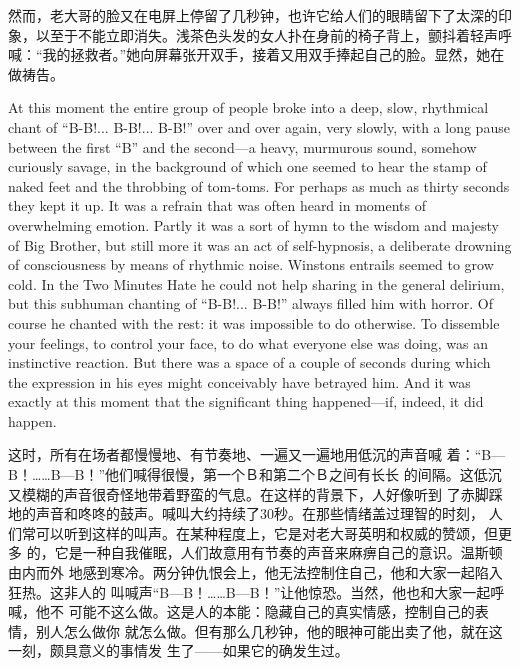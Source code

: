 \begin{paracol}{2}
\switchcolumn

然而，老大哥的脸又在电屏上停留了几秒钟，也许它给人们的眼睛留下了太深的印象，以至于不能立即消失。浅茶色头发的女人扑在身前的椅子背上，颤抖着轻声呼喊：``我的拯救者。''她向屏幕张开双手，接着又用双手捧起自己的脸。显然，她在做祷告。

\switchcolumn*

At this moment the entire group of people broke into a deep, slow,
rhythmical chant of ``B-B!... B-B!... B-B!'' over and over again, very
slowly, with a long pause between the first ``B'' and the second---a
heavy, murmurous sound, somehow curiously savage, in the background of
which one seemed to hear the stamp of naked feet and the throbbing of
tom-toms. For perhaps as much as thirty seconds they kept it up. It was
a refrain that was often heard in moments of overwhelming emotion.
Partly it was a sort of hymn to the wisdom and majesty of Big Brother,
but still more it was an act of self-hypnosis, a deliberate drowning of
consciousness by means of rhythmic noise. Winston\textquotesingle s
entrails seemed to grow cold. In the Two Minutes Hate he could not help
sharing in the general delirium, but this subhuman chanting of ``B-B!...
B-B!'' always filled him with horror. Of course he chanted with the rest:
it was impossible to do otherwise. To dissemble your feelings, to
control your face, to do what everyone else was doing, was an
instinctive reaction. But there was a space of a couple of seconds
during which the expression in his eyes might conceivably have betrayed
him. And it was exactly at this moment that the significant thing
happened---if, indeed, it did happen.

\switchcolumn

这时，所有在场者都慢慢地、有节奏地、一遍又一遍地用低沉的声音喊
着：``B---B！\ldots\ldots B---B！''他们喊得很慢，第一个Ｂ和第二个Ｂ之间有长长
的间隔。这低沉又模糊的声音很奇怪地带着野蛮的气息。在这样的背景下，人好像听到
了赤脚踩地的声音和咚咚的鼓声。喊叫大约持续了30秒。在那些情绪盖过理智的时刻，
人们常可以听到这样的叫声。在某种程度上，它是对老大哥英明和权威的赞颂，但更多
的，它是一种自我催眠，人们故意用有节奏的声音来麻痹自己的意识。温斯顿由内而外
地感到寒冷。两分钟仇恨会上，他无法控制住自己，他和大家一起陷入狂热。这非人的
叫喊声``B---B！\ldots\ldots B---B！''让他惊恐。当然，他也和大家一起呼喊，他不
可能不这么做。这是人的本能：隐藏自己的真实情感，控制自己的表情，别人怎么做你
就怎么做。但有那么几秒钟，他的眼神可能出卖了他，就在这一刻，颇具意义的事情发
生了——如果它的确发生过。

\switchcolumn*


\end{paracol}
